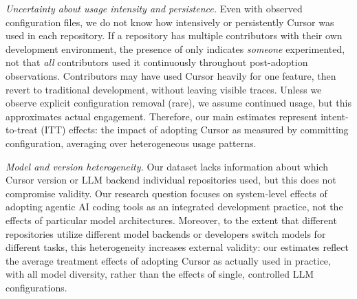 \emph{Uncertainty about usage intensity and persistence.} 
Even with observed configuration files, we do not know how intensively or persistently Cursor was used in each repository. 
If a repository has multiple contributors with their own development environment, the presence of  only indicates \emph{someone} experimented, not that \emph{all} contributors used it continuously throughout post-adoption observations. 
Contributors may have used Cursor heavily for one feature, then revert to traditional development, without leaving visible traces. Unless we observe explicit configuration removal (rare), we assume continued usage, but this approximates actual engagement. 
Therefore, our main estimates represent intent-to-treat (ITT) effects: the impact of adopting Cursor as measured by committing configuration, averaging over heterogeneous usage patterns.

\emph{Model and version heterogeneity.} 
Our dataset lacks information about which Cursor version or LLM backend individual repositories used, but this does not compromise validity. 
Our research question focuses on system-level effects of adopting agentic AI coding tools as an integrated development practice, not the effects of particular model architectures. 
Moreover, to the extent that different repositories utilize different model backends or developers switch models for different tasks, this heterogeneity increases external validity: our estimates reflect the average treatment effects of adopting Cursor as actually used in practice, with all model diversity, rather than the effects of single, controlled LLM configurations.


